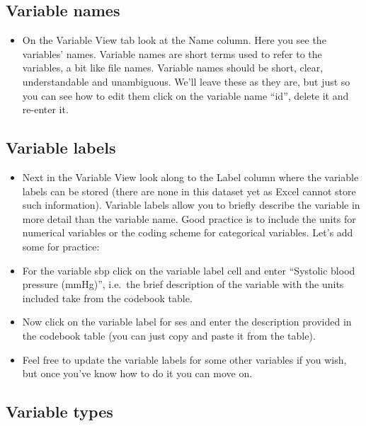\documentclass[
]{book}
\providecommand{\tightlist}{%
  \setlength{\itemsep}{0pt}\setlength{\parskip}{0pt}}
\begin{document}
\hypertarget{variable-names}{%
\subsection{Variable names}\label{variable-names}}

\begin{itemize}
\tightlist
\item
  On the Variable View tab look at the Name column. Here you see the variables' names. Variable names are short terms used to refer to the variables, a bit like file names. Variable names should be short, clear, understandable and unambiguous. We'll leave these as they are, but just so you can see how to edit them click on the variable name ``id'', delete it and re-enter it.
\end{itemize}

\hypertarget{variable-labels}{%
\subsection{Variable labels}\label{variable-labels}}

\begin{itemize}
\item
  Next in the Variable View look along to the Label column where the variable labels can be stored (there are none in this dataset yet as Excel cannot store such information). Variable labels allow you to briefly describe the variable in more detail than the variable name. Good practice is to include the units for numerical variables or the coding scheme for categorical variables. Let's add some for practice:
\item
  For the variable sbp click on the variable label cell and enter ``Systolic blood pressure (mmHg)'', i.e.~the brief description of the variable with the units included take from the codebook table.
\item
  Now click on the variable label for ses and enter the description provided in the codebook table (you can just copy and paste it from the table).
\item
  Feel free to update the variable labels for some other variables if you wish, but once you've know how to do it you can move on.
\end{itemize}

\hypertarget{variable-types}{%
\subsection{Variable types}\label{variable-types}}
\end{document}
